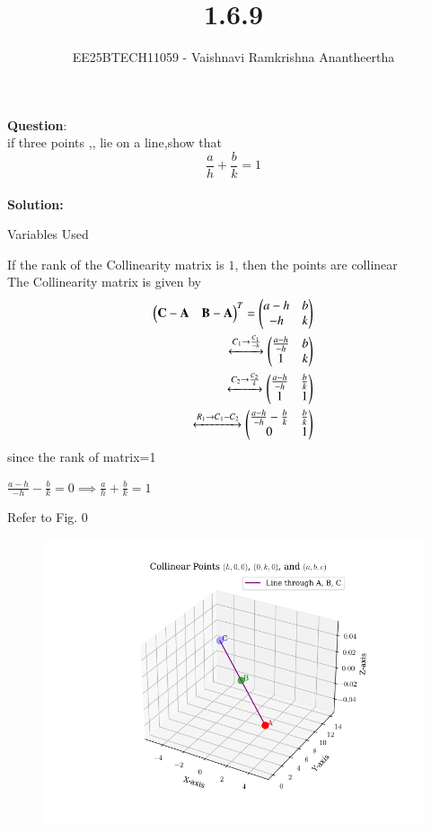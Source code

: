 \documentclass[journal]{IEEEtran}
\title{1.6.9}
\author{EE25BTECH11059 - Vaishnavi Ramkrishna Anantheertha}
\begin{document}
\maketitle

\renewcommand{\thefigure}{\theenumi}
\renewcommand{\thetable}{\theenumi}


\textbf{Question}:\\
if three points ,, lie on a line,show that
\[
\frac{a}{h} + \frac{b}{k} = 1
\]
\\
\textbf{Solution: }
\begin{table}[H]    
  \centering
  
  \caption{Variables Used}
  \label{tab:1.6.9}
\end{table}
If the rank of the Collinearity matrix is $1$, then the points are collinear\\
   The Collinearity matrix is given by\\
\begin{align}
\begin{pmatrix}
   \mathbf{C}-\mathbf{A} & \mathbf{B}-\mathbf{A}
 \end{pmatrix}^T = \begin{pmatrix}
    a-h & b
   \\
   -h & k
   \end{pmatrix}\\
 \xleftrightarrow[]{C_1 \rightarrow {\frac{C_1}{-h}}}
 \begin{pmatrix}
   \frac{a-h}{-h} & b
   \\
   1 & k
   \end{pmatrix}\\
    \xleftrightarrow[]{C_2 \rightarrow {\frac{C_2}{k}}}
 \begin{pmatrix}
   \frac{a-h}{-h} & \frac{b}{k}
   \\
    1 & 1
   \end{pmatrix}\\
      \xleftrightarrow[]{R_1 \rightarrow C_1- C_2}
 \begin{pmatrix}
   \frac{a-h}{-h}-\frac{b}{k} & \frac{b}{k} 
   \\
   0 & 1
   \end{pmatrix}
\end{align}
since the rank of matrix=1
\begin{center}

$\frac{a-h}{-h}-\frac{b}{k}=0 \implies \frac{a}{h}+\frac{b}{k}=1$
\end{center}
Refer to Fig. 0

\begin{figure}[H]
\begin{center}
\includegraphics[width=0.6\columnwidth]{figs/graph1.png}
\end{center}
\caption{}
\label{fig:Fig}
\end{figure}
\end{document}
